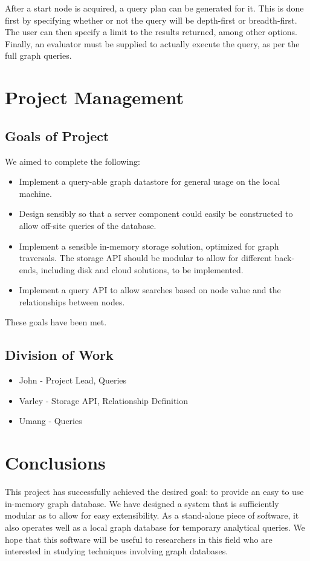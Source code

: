 \documentclass[11pt]{article}
\begin{document}
After a start node is acquired, a query plan can be generated for it. This is done first by specifying whether or not the query will be depth-first or breadth-first. The user can then specify a limit to the results returned, among other options. Finally, an evaluator must be supplied to actually execute the query, as per the full graph queries.

\section{Project Management}

\subsection{Goals of Project}
We aimed to complete the following:

\begin{itemize}
\item Implement a query-able graph datastore for general usage on the local machine.
\item Design sensibly so that a server component could easily be constructed to allow off-site queries of the database.
\item Implement a sensible in-memory storage solution, optimized for graph traversals. The storage API should be modular to allow for different back-ends, including disk and cloud solutions, to be implemented.
\item Implement a query API to allow searches based on node value and the relationships between nodes.
\end{itemize}

These goals have been met.

\subsection{Division of Work}

\begin{itemize}
\item John - Project Lead, Queries
\item Varley - Storage API, Relationship Definition
\item Umang -  Queries
\end{itemize}

\section{Conclusions}

This project has successfully achieved the desired goal: to provide an easy to use in-memory graph database. We have designed a system that is sufficiently modular as to allow for easy extensibility. As a stand-alone piece of software, it also operates well as a local graph database for temporary analytical queries.  We hope that this software will be useful to researchers in this field who are interested in studying techniques involving graph databases.



\end{document}
